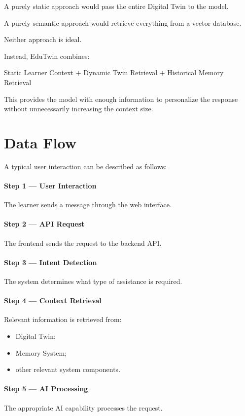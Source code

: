 \documentclass[12pt,a4paper]{article}
\begin{document}
A purely static approach would pass the entire Digital Twin to the model.

A purely semantic approach would retrieve everything from a vector database.

Neither approach is ideal.

Instead, EduTwin combines:
\begin{center}
Static Learner Context $+$ Dynamic Twin Retrieval $+$ Historical Memory Retrieval
\end{center}

This provides the model with enough information to personalize the response without unnecessarily increasing the context size.

\section{Data Flow}
A typical user interaction can be described as follows:

\paragraph{Step 1 — User Interaction} The learner sends a message through the web interface.

\paragraph{Step 2 — API Request} The frontend sends the request to the backend API.

\paragraph{Step 3 — Intent Detection} The system determines what type of assistance is required.

\paragraph{Step 4 — Context Retrieval} Relevant information is retrieved from:
\begin{itemize}[noitemsep,topsep=2pt]
    \item Digital Twin;
    \item Memory System;
    \item other relevant system components.
\end{itemize}

\paragraph{Step 5 — AI Processing} The appropriate AI capability processes the request.
\end{document}
